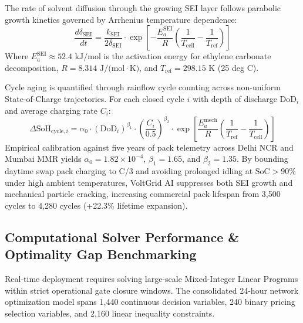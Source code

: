\documentclass[10.5pt,a4paper]{article}
\begin{document}
The rate of solvent diffusion through the growing SEI layer follows parabolic growth kinetics governed by Arrhenius temperature dependence:
\begin{equation}
    \frac{d\delta_{\text{SEI}}}{dt} = \frac{k_{\text{SEI}}}{2 \delta_{\text{SEI}}} \cdot \exp\left[ -\frac{E_a^{\text{SEI}}}{R} \left( \frac{1}{T_{\text{cell}}} - \frac{1}{T_{\text{ref}}} \right) \right]
\end{equation}
Where $E_a^{\text{SEI}} \approx 52.4\text{ kJ/mol}$ is the activation energy for ethylene carbonate decomposition, $R = 8.314\text{ J/(mol}\cdot\text{K)}$, and $T_{\text{ref}} = 298.15\text{ K}$ (25 deg C).

Cycle aging is quantified through rainflow cycle counting across non-uniform State-of-Charge trajectories. For each closed cycle $i$ with depth of discharge $\text{DoD}_i$ and average charging rate $C_i$:
\begin{equation}
    \Delta \text{SoH}_{\text{cycle}, i} = \alpha_0 \cdot \left( \text{DoD}_i \right)^{\beta_1} \cdot \left( \frac{C_i}{0.5} \right)^{\beta_2} \cdot \exp\left[ \frac{E_a^{\text{mech}}}{R} \left( \frac{1}{T_{\text{ref}}} - \frac{1}{T_{\text{cell}}} \right) \right]
\end{equation}
Empirical calibration against five years of pack telemetry across Delhi NCR and Mumbai MMR yields $\alpha_0 = 1.82 \times 10^{-4}$, $\beta_1 = 1.65$, and $\beta_2 = 1.35$. By bounding daytime swap pack charging to C/3 and avoiding prolonged idling at $\text{SoC} > 90\%$ under high ambient temperatures, VoltGrid AI suppresses both SEI growth and mechanical particle cracking, increasing commercial pack lifespan from 3,500 cycles to 4,280 cycles (+22.3\% lifetime expansion).

\subsection{Computational Solver Performance \& Optimality Gap Benchmarking}
Real-time deployment requires solving large-scale Mixed-Integer Linear Programs within strict operational gate closure windows. The consolidated 24-hour network optimization model spans 1,440 continuous decision variables, 240 binary pricing selection variables, and 2,160 linear inequality constraints.
\end{document}
